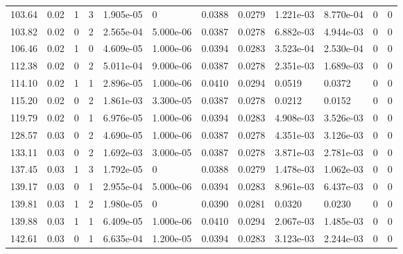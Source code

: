 \documentclass[preview]{standalone}
\begin{document}
{{\begin{tabular}{L{1.2cm}C{1.2cm} C{0.3cm}C{0.5cm} C{1.4cm}C{1.4cm} C{1.4cm}C{1.4cm} C{1.6cm}C{1.6cm} C{1.6cm}C{1.6cm}}
  103.64  &  0.02  & 1     &  3 &  1.905e-05  & 0  &  0.0388&   0.0279& 1.221e-03 & 8.770e-04   &  0 & 0  \\ 
  103.82  &  0.02  & 0     &  2 &  2.565e-04  & 5.000e-06  &  0.0387&   0.0278& 6.882e-03 & 4.944e-03   &  0 & 0  \\ 
  106.46  &  0.02  & 1     &  0 &  4.609e-05  & 1.000e-06  &  0.0394&   0.0283& 3.523e-04 & 2.530e-04   &  0 & 0  \\ 
  112.38  &  0.02  & 0     &  2 &  5.011e-04  & 9.000e-06  &  0.0387&   0.0278& 2.351e-03 & 1.689e-03   &  0 & 0  \\ 
  114.10  &  0.02  & 1     &  1 &  2.896e-05  & 1.000e-06  &  0.0410&   0.0294& 0.0519 & 0.0372   &  0 & 0  \\ 
  115.20  &  0.02  & 0     &  2 &  1.861e-03  & 3.300e-05  &  0.0387&   0.0278& 0.0212 & 0.0152   &  0 & 0  \\ 
  119.79  &  0.02  & 0     &  1 &  6.976e-05  & 1.000e-06  &  0.0394&   0.0283& 4.908e-03 & 3.526e-03   &  0 & 0  \\ 
  128.57  &  0.03  & 0     &  2 &  4.690e-05  & 1.000e-06  &  0.0387&   0.0278& 4.351e-03 & 3.126e-03   &  0 & 0  \\ 
  133.11  &  0.03  & 0     &  2 &  1.692e-03  & 3.000e-05  &  0.0387&   0.0278& 3.871e-03 & 2.781e-03   &  0 & 0  \\ 
  137.45  &  0.03  & 1     &  3 &  1.792e-05  & 0  &  0.0388&   0.0279& 1.478e-03 & 1.062e-03   &  0 & 0  \\ 
  139.17  &  0.03  & 0     &  1 &  2.955e-04  & 5.000e-06  &  0.0394&   0.0283& 8.961e-03 & 6.437e-03   &  0 & 0  \\ 
  139.81  &  0.03  & 1     &  2 &  1.980e-05  & 0  &  0.0390&   0.0281& 0.0320 & 0.0230   &  0 & 0  \\ 
  139.88  &  0.03  & 1     &  1 &  6.409e-05  & 1.000e-06  &  0.0410&   0.0294& 2.067e-03 & 1.485e-03   &  0 & 0  \\ 
  142.61  &  0.03  & 0     &  1 &  6.635e-04  & 1.200e-05  &  0.0394&   0.0283& 3.123e-03 & 2.244e-03   &  0 & 0  \\ 
\hline 
\end{tabular} 

}}
\end{document}
